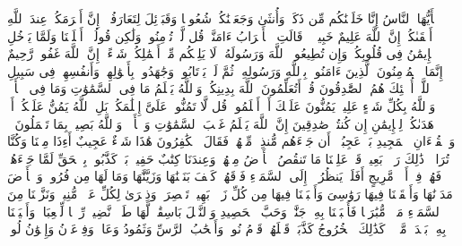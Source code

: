 \stopbuffer
\startbuffer[\q:49:13]
یَٰۤأَیُّهَا ٱلنَّاسُ إِنَّا خَلَقۡنَٰكُم مِّن ذَكَرࣲ وَأُنثَىٰ وَجَعَلۡنَٰكُمۡ شُعُوبࣰا وَقَبَاۤئِلَ لِتَعَارَفُوۤا۟ۚ إِنَّ أَكۡرَمَكُمۡ عِندَ ٱللَّهِ أَتۡقَىٰكُمۡۚ إِنَّ ٱللَّهَ عَلِیمٌ خَبِیرࣱ%
\stopbuffer
\startbuffer[\q:49:14]
۞ قَالَتِ ٱلۡأَعۡرَابُ ءَامَنَّاۖ قُل لَّمۡ تُؤۡمِنُوا۟ وَلَٰكِن قُولُوۤا۟ أَسۡلَمۡنَا وَلَمَّا یَدۡخُلِ ٱلۡإِیمَٰنُ فِی قُلُوبِكُمۡۖ وَإِن تُطِیعُوا۟ ٱللَّهَ وَرَسُولَهُۥ لَا یَلِتۡكُم مِّنۡ أَعۡمَٰلِكُمۡ شَیۡءًاۚ إِنَّ ٱللَّهَ غَفُورࣱ رَّحِیمٌ%
\stopbuffer
\startbuffer[\q:49:15]
إِنَّمَا ٱلۡمُؤۡمِنُونَ ٱلَّذِینَ ءَامَنُوا۟ بِٱللَّهِ وَرَسُولِهِۦ ثُمَّ لَمۡ یَرۡتَابُوا۟ وَجَٰهَدُوا۟ بِأَمۡوَٰلِهِمۡ وَأَنفُسِهِمۡ فِی سَبِیلِ ٱللَّهِۚ أُو۟لَٰۤئِكَ هُمُ ٱلصَّٰدِقُونَ%
\stopbuffer
\startbuffer[\q:49:16]
قُلۡ أَتُعَلِّمُونَ ٱللَّهَ بِدِینِكُمۡ وَٱللَّهُ یَعۡلَمُ مَا فِی ٱلسَّمَٰوَٰتِ وَمَا فِی ٱلۡأَرۡضِۚ وَٱللَّهُ بِكُلِّ شَیۡءٍ عَلِیمࣱ%
\stopbuffer
\startbuffer[\q:49:17]
یَمُنُّونَ عَلَیۡكَ أَنۡ أَسۡلَمُوا۟ۖ قُل لَّا تَمُنُّوا۟ عَلَیَّ إِسۡلَٰمَكُمۖ بَلِ ٱللَّهُ یَمُنُّ عَلَیۡكُمۡ أَنۡ هَدَىٰكُمۡ لِلۡإِیمَٰنِ إِن كُنتُمۡ صَٰدِقِینَ%
\stopbuffer
\startbuffer[\q:49:18]
إِنَّ ٱللَّهَ یَعۡلَمُ غَیۡبَ ٱلسَّمَٰوَٰتِ وَٱلۡأَرۡضِۚ وَٱللَّهُ بَصِیرُۢ بِمَا تَعۡمَلُونَ%
\stopbuffer
\startbuffer[\q:50:1]
قۤۚ وَٱلۡقُرۡءَانِ ٱلۡمَجِیدِ%
\stopbuffer
\startbuffer[\q:50:2]
بَلۡ عَجِبُوۤا۟ أَن جَاۤءَهُم مُّنذِرࣱ مِّنۡهُمۡ فَقَالَ ٱلۡكَٰفِرُونَ هَٰذَا شَیۡءٌ عَجِیبٌ%
\stopbuffer
\startbuffer[\q:50:3]
أَءِذَا مِتۡنَا وَكُنَّا تُرَابࣰاۖ ذَٰلِكَ رَجۡعُۢ بَعِیدࣱ%
\stopbuffer
\startbuffer[\q:50:4]
قَدۡ عَلِمۡنَا مَا تَنقُصُ ٱلۡأَرۡضُ مِنۡهُمۡۖ وَعِندَنَا كِتَٰبٌ حَفِیظُۢ%
\stopbuffer
\startbuffer[\q:50:5]
بَلۡ كَذَّبُوا۟ بِٱلۡحَقِّ لَمَّا جَاۤءَهُمۡ فَهُمۡ فِیۤ أَمۡرࣲ مَّرِیجٍ%
\stopbuffer
\startbuffer[\q:50:6]
أَفَلَمۡ یَنظُرُوۤا۟ إِلَى ٱلسَّمَاۤءِ فَوۡقَهُمۡ كَیۡفَ بَنَیۡنَٰهَا وَزَیَّنَّٰهَا وَمَا لَهَا مِن فُرُوجࣲ%
\stopbuffer
\startbuffer[\q:50:7]
وَٱلۡأَرۡضَ مَدَدۡنَٰهَا وَأَلۡقَیۡنَا فِیهَا رَوَٰسِیَ وَأَنۢبَتۡنَا فِیهَا مِن كُلِّ زَوۡجِۭ بَهِیجࣲ%
\stopbuffer
\startbuffer[\q:50:8]
تَبۡصِرَةࣰ وَذِكۡرَىٰ لِكُلِّ عَبۡدࣲ مُّنِیبࣲ%
\stopbuffer
\startbuffer[\q:50:9]
وَنَزَّلۡنَا مِنَ ٱلسَّمَاۤءِ مَاۤءࣰ مُّبَٰرَكࣰا فَأَنۢبَتۡنَا بِهِۦ جَنَّٰتࣲ وَحَبَّ ٱلۡحَصِیدِ%
\stopbuffer
\startbuffer[\q:50:10]
وَٱلنَّخۡلَ بَاسِقَٰتࣲ لَّهَا طَلۡعࣱ نَّضِیدࣱ%
\stopbuffer
\startbuffer[\q:50:11]
رِّزۡقࣰا لِّلۡعِبَادِۖ وَأَحۡیَیۡنَا بِهِۦ بَلۡدَةࣰ مَّیۡتࣰاۚ كَذَٰلِكَ ٱلۡخُرُوجُ%
\stopbuffer
\startbuffer[\q:50:12]
كَذَّبَتۡ قَبۡلَهُمۡ قَوۡمُ نُوحࣲ وَأَصۡحَٰبُ ٱلرَّسِّ وَثَمُودُ%
\stopbuffer
\startbuffer[\q:50:13]
وَعَادࣱ وَفِرۡعَوۡنُ وَإِخۡوَٰنُ لُوطࣲ%
